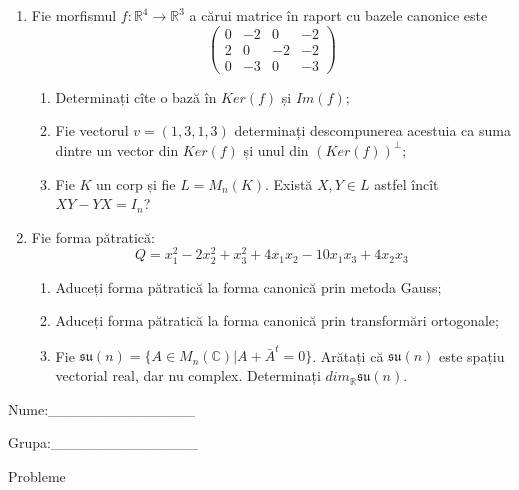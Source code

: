 \documentclass{article}
\begin{document}
\begin{enumerate}
 \item Fie morfismul $f:\mathbb{R}^4 \to \mathbb{R}^3$ a cărui matrice în raport cu bazele canonice este
$$\begin{pmatrix}
0&-2&0&-2\\
2&0&-2&-2\\
0&-3&0&-3
\end{pmatrix}$$

\begin{enumerate}
\item Determinați cîte o bază în $Ker(f)$ și $Im(f)$;
\item Fie vectorul $v=(1,3,1,3)$ determinați descompunerea acestuia ca suma dintre un vector din $Ker(f)$ și unul din $(Ker(f))^\perp$;
\item Fie $K$ un corp și fie $L=M_n(K)$. Există $X,Y \in L$ astfel încît $XY-YX=I_n$?  
\end{enumerate}
\item Fie forma pătratică:
$$Q= x_1^2-2x_2^2+x_3^2+4x_1x_2-10x_1x_3+4x_2x_3$$

\begin{enumerate}
\item Aduceți forma pătratică la forma canonică prin metoda Gauss;
\item Aduceți forma pătratică la forma canonică prin transformări ortogonale;
\item Fie $\mathfrak{su}(n)=\{ A \in M_n(\mathbb{C}) | A+\bar{A}^t=0\}$. Arătați că $\mathfrak{su}(n)$ este spațiu vectorial real, dar nu complex.
Determinați $dim_{\mathbb{R}}\mathfrak{su}(n)$.
\end{enumerate}
\end{enumerate}
\newpage
\begin{flushright}
Nume:\_\_\_\_\_\_\_\_\_\_\_\_\_\_
 
 
Grupa:\_\_\_\_\_\_\_\_\_\_\_\_\_\_
\end{flushright}
\begin{center}
\vspace{2cm}
{\Large Probleme}
\vspace{2cm}
\end{center}
\end{document}
